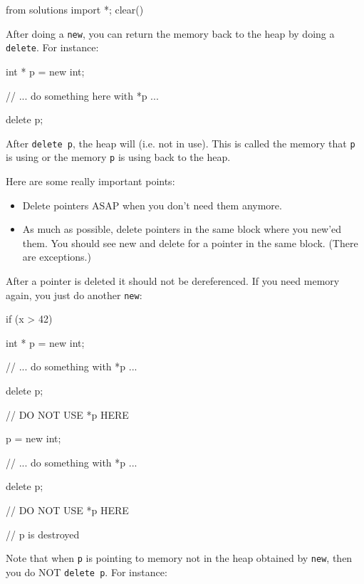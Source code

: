 \begin{python0}
from solutions import *; clear()
\end{python0}

After doing a \texttt{new}, you can return the memory back to the heap by
doing a \texttt{delete}. For instance:


\begin{consolethree}[escapeinside=||]
int * p = new int;

// ... do something here with *p ...

delete p;
\end{consolethree}
After \texttt{delete p}, the heap will  (i.e. not in use). This is called  the memory that \texttt{p} is using or  the memory \texttt{p} is using back to the heap.

Here are some really important points:

\begin{itemize}

\item
  Delete pointers ASAP when you don't need them anymore.
\item
  As much as possible, delete pointers in the same block where you
  new'ed them. You should see new and delete for a pointer in the same
  block. (There are exceptions.)
\end{itemize}

After a pointer is deleted it should not be dereferenced. If you need memory again, you just do another \texttt{new}:

\begin{consolethree}[escapeinside=||]
if (x > 42)
{
    int * p = new int;

    // ... do something with *p ...

    delete p;

    // DO NOT USE *p HERE

    p = new int;

    // ... do something with *p ...

    delete p;

    // DO NOT USE *p HERE
}

// p is destroyed 
\end{consolethree}
Note that when \texttt{p} is pointing to memory not in the heap obtained by \texttt{new}, then you do NOT \texttt{delete p}. For instance:

